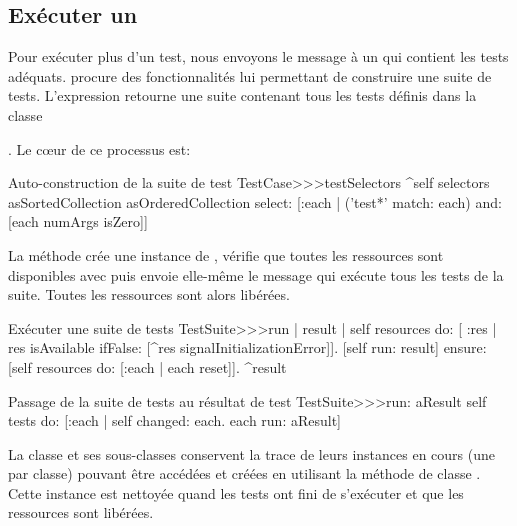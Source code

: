 \documentclass[a4paper,10pt,twoside]{book}
\begin{document}
\subsection{Exécuter un }
Pour exécuter plus d'un test, nous envoyons le message  à un  qui contient 
les tests adéquats.  procure des fonctionnalités lui permettant de construire  
une suite de tests. L'expression  retourne une suite 
contenant tous les tests définis dans la classe {. Le c{\oe}ur de ce processus est:

\begin{method}[testcasetestselectors]{Auto-construction de la suite de test}
TestCase>>>testSelectors 
	^self selectors asSortedCollection asOrderedCollection select: [:each | 
		('test*' match: each) and: [each numArgs isZero]]
\end{method}

La méthode  crée une instance de , vérifie que toutes les 
ressources sont disponibles avec  puis envoie elle-même le 
message  qui exécute tous les tests de la suite. 
Toutes les ressources sont alors libérées.

\begin{method}[testsuiterun]{Exécuter une suite de tests}
TestSuite>>>run
	| result |
  self resources do: [ :res |
		res isAvailable ifFalse: [^res signalInitializationError]].
	[self run: result] ensure: [self resources do: [:each | each reset]].
	^result
\end{method}


\begin{method}[testsuiterun:]{Passage de la suite de tests au résultat de test}
TestSuite>>>run: aResult
	self tests do: [:each |
	  self changed: each.
	  each run: aResult]
\end{method}
La classe  et ses sous-classes conservent la trace de leurs instances 
en cours (une par classe) pouvant être accédées et créées en utilisant la méthode de 
classe . Cette instance est nettoyée quand les tests 
ont fini de s'exécuter et que les ressources sont libérées.


}
\end{document}
